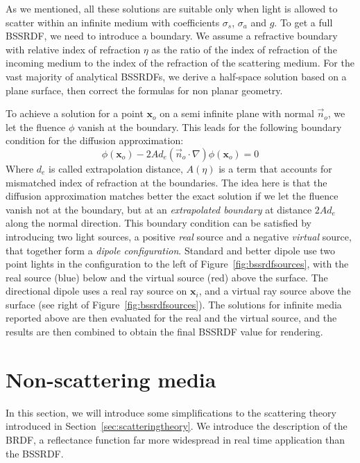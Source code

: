 %
As we mentioned, all these solutions are suitable only when light is allowed to scatter within an infinite medium with coefficients $\sigma_s$, $\sigma_a$ and $g$. To get a full BSSRDF, we need to introduce a boundary. We assume a refractive boundary with relative index of refraction $\eta$ as the ratio of the index of refraction of the incoming medium to the index of the refraction of the scattering medium. For the vast majority of analytical BSSRDFs, we derive a half-space solution based on a plane surface, then correct the formulas for non planar geometry.

To achieve a solution for a point $\mathbf{x}_o$ on a semi infinite plane with normal $\vec{n}_o$, we let the fluence $\phi$ vanish at the boundary. This leads for the following boundary condition for the diffusion approximation: 
\begin{equation*}
\phi(\mathbf{x}_o) - 2 A d_e (\vec{n}_o \cdot \nabla) \phi(\mathbf{x}_o) = 0
\end{equation*}
Where $d_e$ is called extrapolation distance, $A(\eta)$ is a term that accounts for mismatched index of refraction at the boundaries. The idea here is that the diffusion approximation matches better the exact solution if we let the fluence vanish not at the boundary, but at an \emph{extrapolated boundary} at distance $2 A d_e$ along the normal direction. This boundary condition can be satisfied by introducing two light sources, a positive \emph{real} source and a negative \emph{virtual} source, that together form a \emph{dipole configuration}.  Standard and better dipole use two point lights in the configuration to the left of Figure~\ref{fig:bssrdfsources}, with the real source (blue) below and the virtual source (red) above the surface. The directional dipole uses a real ray source on $\mathbf{x}_i$, and a virtual ray source above the surface (see right of Figure~\ref{fig:bssrdfsources}). The solutions for infinite media reported above are then evaluated for the real and the virtual source, and the results are then combined to obtain the final BSSRDF value for rendering. 

\section{Non-scattering media}
\label{sec:brdftheory}
In this section, we will introduce some simplifications to the scattering theory introduced in Section~\ref{sec:scatteringtheory}. We introduce the description of the BRDF, a reflectance function far more widespread in real time application than the BSSRDF.   

